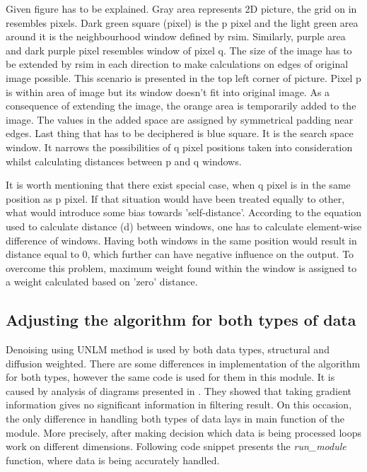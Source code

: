 Given figure has to be explained. Gray area represents 2D picture, the grid on in resembles pixels. Dark green square (pixel) is the p pixel and the light green area around it is the neighbourhood window defined by rsim. Similarly, purple area and dark purple pixel resembles window of pixel q. The size of the image has to be extended by rsim in each direction to make calculations on edges of original image possible. This scenario is presented in the top left corner of picture. Pixel p is within area of image but its window doesn't fit into original image. As a consequence of extending the image, the orange area is temporarily added to the image. The values in the added space are assigned by symmetrical padding near edges. Last thing that has to be deciphered is blue square. It is the search space window. It narrows the possibilities of q pixel positions taken into consideration whilst calculating distances between p and q windows.

It is worth mentioning that there exist special case, when q pixel is in the same position as p pixel. If that situation would have been treated equally to other, what would introduce some bias towards 'self-distance'. According to the equation used to calculate distance (d) between windows, one has to calculate element-wise difference of windows. Having both windows in the same position would result in distance equal to 0, which further can have negative influence on the output. To overcome this problem, maximum weight found within the window is assigned to a weight calculated based on 'zero' distance.


\subsection*{Adjusting the algorithm for both types of data}
Denoising using UNLM method is used by both data types, structural and diffusion weighted. There are some differences in implementation of the algorithm for both types, however the same code is used for them in this module. It is caused by analysis of diagrams presented in \cite{5a2}. They showed that taking gradient information gives no significant information in filtering result. On this occasion, the only difference in handling both types of data lays in main function of the module. More precisely, after making decision which data is being processed loops work on different dimensions. Following code snippet presents the \textit{run\_module} function, where data is being accurately handled.

